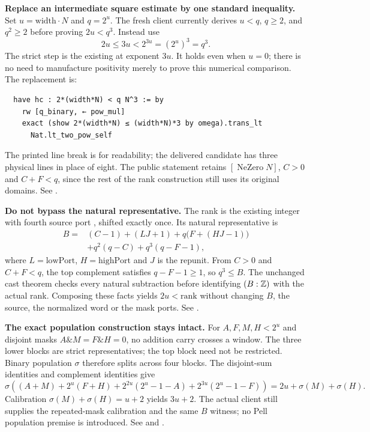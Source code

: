\textbf{Replace an intermediate square estimate by one standard inequality.} Set $u=\mathrm{width}\cdot N$ and $q=2^u$. The fresh client  currently derives $u<q$, $q\ge2$, and $q^2\ge2$ before proving $2u<q^3$. Instead use
\[
 2u\le3u<2^{3u}=(2^u)^3=q^3.
\]
The strict step is the existing \href{https://github.com/leanprover/lean4/blob/v4.32.0/src/Init/Data/Nat/Lemmas.lean\#L1231-L1232}{} at exponent $3u$. It holds even when $u=0$; there is no need to manufacture positivity merely to prove this numerical comparison. The replacement is:
\begin{lstlisting}
  have hc : 2*(width*N) < q N^3 := by
    rw [q_binary, ← pow_mul]
    exact (show 2*(width*N) ≤ (width*N)*3 by omega).trans_lt
      Nat.lt_two_pow_self
\end{lstlisting}
The printed line break is for readability; the delivered candidate has three physical lines in place of eight. The public statement retains $[\operatorname{NeZero}N]$, $C>0$ and $C+F<q$, since the rest of the rank construction still uses its original domains. See .

\textbf{Do not bypass the natural representative.} The rank is the existing integer  with fourth source port , shifted exactly once. Its natural representative is
\begin{align*}
 B={}&(C-1)+(LJ+1)+q\bigl(F+(HJ-1)\bigr)\\
    &+q^2(q-C)+q^3(q-F-1),
\end{align*}
where $L=\mathrm{lowPort}$, $H=\mathrm{highPort}$ and $J$ is the repunit. From $C>0$ and $C+F<q$, the top complement satisfies $q-F-1\ge1$, so $q^3\le B$. The unchanged cast theorem checks every natural subtraction before identifying $(B:\mathbb Z)$ with the actual rank. Composing these facts yields $2u<\mathrm{rank}$ without changing $B$, the source, the normalized word or the mask ports. See .

\textbf{The exact population construction stays intact.} For $A,F,M,H<2^u$ and disjoint masks $A\mathbin{\&}M=F\mathbin{\&}H=0$, no addition carry crosses a window. The three lower blocks are strict representatives; the top block need not be restricted. Binary population $\sigma$ therefore splits across four blocks. The disjoint-sum identities and complement identities give
\[
 \sigma\!\left((A+M)+2^u(F+H)+2^{2u}(2^u-1-A)+2^{3u}(2^u-1-F)\right)
 =2u+\sigma(M)+\sigma(H).
\]
Calibration $\sigma(M)+\sigma(H)=u+2$ yields $3u+2$. The actual client still supplies the repeated-mask calibration and the same $B$ witness; no Pell population premise is introduced. See  and .

